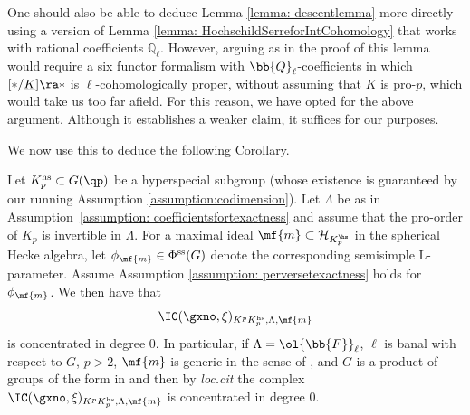 \documentclass[letterpaper,11pt]{amsart}
\begin{document}
\begin{remark}
One should also be able to deduce Lemma \ref{lemma: descentlemma} more directly using a version of Lemma \ref{lemma: HochschildSerreforIntCohomology} that works with rational coefficients $\mathbb{Q}_{\ell}$. However, arguing as in the proof of this lemma would require a six functor formalism with $\bb{Q}_{\ell}$-coefficients in which $[\ast/\underline{K}] \ra \ast$ is $\ell$-cohomologically proper, without assuming that $K$ is pro-$p$, which would take us too far afield. For this reason, we have opted for the above argument. Although it establishes a weaker claim, it suffices for our purposes.
\end{remark}
We now use this to deduce the following Corollary.
\begin{corollary}{\label{cor: HeckeAlgebraResult}}
Let $K_p^{\mathrm{hs}} \subset G(\qp)$ be a hyperspecial subgroup (whose existence is guaranteed by our running Assumption \ref{assumption:codimension}). Let $\Lambda$ be as in Assumption~\ref{assumption: coefficientsfortexactness} and assume that the pro-order of $K_{p}$ is invertible in $\Lambda$. For a maximal ideal $\mf{m} \subset \mathcal{H}_{K_{p}^{\hs}}$ in the spherical Hecke algebra, let $\phi_{\mf{m}} \in \Phi^{\mathrm{ss}}(G)$ denote the corresponding semisimple L-parameter. Assume Assumption \ref{assumption: perversetexactness} holds for $\phi_{\mf{m}}$. We then have that 
\[ \IC(\gxno,\xi)_{K^{p}K_{p}^{\mathrm{hs}},\Lambda,\mf{m}} \]
is concentrated in degree $0$. In particular, if $\Lambda = \ol{\bb{F}}_{\ell}$, $\ell$ is banal with respect to $G$, $p > 2$, $\mf{m}$ is generic in the sense of \cite[Definition~1.1]{HamannLeeTorsion}, and $G$ is a product of groups of the form in \cite[Table~(1)]{HamannLeeTorsion} and \cite[Theorem~8.2.1]{peng2025farguesscholzeparameterstorsionvanishing} then by \textit{loc.cit} the complex $\IC(\gxno,\xi)_{K^{p}K_{p}^{\mathrm{hs}},\Lambda,\mf{m}}$ is concentrated in degree $0$.
\end{corollary}
\end{document}
